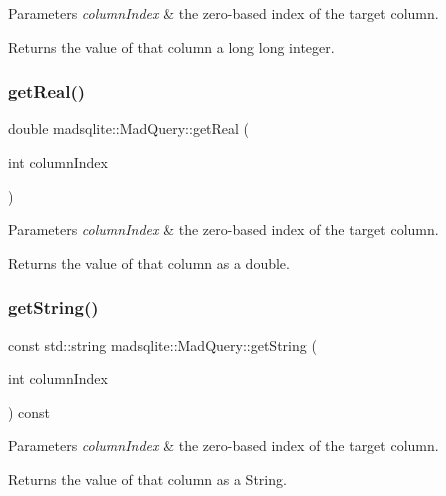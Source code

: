 \begin{DoxyParams}{Parameters}
{\em column\+Index} & the zero-\/based index of the target column. \\
\hline
\end{DoxyParams}
\begin{DoxyReturn}{Returns}
the value of that column a long long integer. 
\end{DoxyReturn}
\hypertarget{classmadsqlite_1_1_mad_query_ab1d5375285453976e078f320c73e224f}{}\label{classmadsqlite_1_1_mad_query_ab1d5375285453976e078f320c73e224f} 
\subsubsection{\texorpdfstring{get\+Real()}{getReal()}}
{\footnotesize\ttfamily double madsqlite\+::\+Mad\+Query\+::get\+Real (\begin{DoxyParamCaption}\item[{int}]{column\+Index }\end{DoxyParamCaption})}


\begin{DoxyParams}{Parameters}
{\em column\+Index} & the zero-\/based index of the target column. \\
\hline
\end{DoxyParams}
\begin{DoxyReturn}{Returns}
the value of that column as a double. 
\end{DoxyReturn}
\hypertarget{classmadsqlite_1_1_mad_query_a63b55fe68d013c3d1fdade2391233cb9}{}\label{classmadsqlite_1_1_mad_query_a63b55fe68d013c3d1fdade2391233cb9} 
\subsubsection{\texorpdfstring{get\+String()}{getString()}}
{\footnotesize\ttfamily const std\+::string madsqlite\+::\+Mad\+Query\+::get\+String (\begin{DoxyParamCaption}\item[{int}]{column\+Index }\end{DoxyParamCaption}) const}


\begin{DoxyParams}{Parameters}
{\em column\+Index} & the zero-\/based index of the target column. \\
\hline
\end{DoxyParams}
\begin{DoxyReturn}{Returns}
the value of that column as a String. 
\end{DoxyReturn}
\hypertarget{classmadsqlite_1_1_mad_query_a0fa757aa8333e3fc53c57442bdf4cad7}{}\label{classmadsqlite_1_1_mad_query_a0fa757aa8333e3fc53c57442bdf4cad7} 
